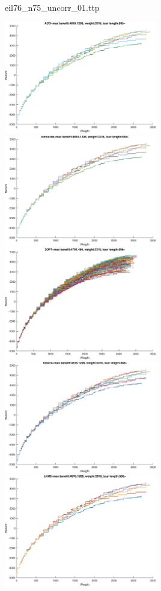 \documentclass{article}
\begin{document}
\newpage
eil76\_n75\_uncorr\_01.ttp

\noindent
\includegraphics[width=0.5\textwidth]{eil76figs/eil76_n75_uncorr_01.ttp.aco.txt.eps}
\includegraphics[width=0.5\textwidth]{eil76figs/eil76_n75_uncorr_01.ttp.con.txt.eps}
\includegraphics[width=0.5\textwidth]{eil76figs/eil76_n75_uncorr_01.ttp.inv.txt.eps}
\includegraphics[width=0.5\textwidth]{eil76figs/eil76_n75_uncorr_01.ttp.lkh.txt.eps}
\includegraphics[width=0.5\textwidth]{eil76figs/eil76_n75_uncorr_01.ttp.lkh2.txt.eps}
\end{document}
